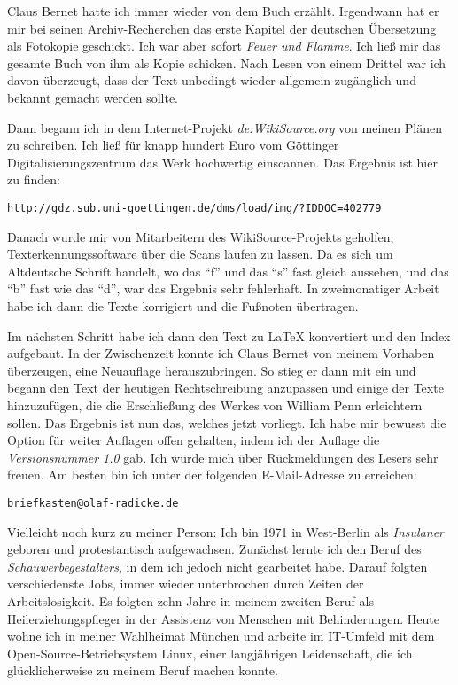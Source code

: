 \medskip

Claus Bernet hatte ich immer wieder von dem Buch erzählt. Irgendwann hat er mir
bei seinen Archiv-Recherchen das erste Kapitel der deutschen Übersetzung als
Fotokopie geschickt. Ich war aber sofort \textit{Feuer und
Flamme}. Ich ließ mir das gesamte Buch von ihm als Kopie schicken. Nach Lesen
von einem Drittel war
ich davon überzeugt, dass der Text unbedingt wieder allgemein zugänglich und
bekannt gemacht werden sollte.

\medskip

Dann begann ich in dem Internet-Projekt \textit{de.WikiSource.org} von meinen
Plänen
zu schreiben. Ich ließ für knapp hundert Euro vom Göttinger
Digitalisierungszentrum das Werk hochwertig einscannen. Das Ergebnis ist hier zu
finden:

\begin{center}
\texttt{http://gdz.sub.uni-goettingen.de/dms/load/img/?IDDOC=402779}
\end{center}

Danach wurde mir von Mitarbeitern des WikiSource-Projekts geholfen,
Texterkennungssoftware über die Scans laufen zu lassen. Da es sich um
Altdeutsche Schrift handelt, wo das "`f"' und das "`s"' fast gleich aussehen,
und das "`b"' fast wie das "`d"', war das Ergebnis sehr fehlerhaft. In
zweimonatiger Arbeit habe ich dann die Texte korrigiert und die Fußnoten
übertragen.

\medskip

Im nächsten Schritt habe ich dann den Text zu \LaTeX{} konvertiert und den Index
aufgebaut. In der Zwischenzeit konnte ich Claus Bernet von meinem Vorhaben
überzeugen, eine Neuauflage herauszubringen. So stieg er dann mit ein und begann
den Text der heutigen Rechtschreibung anzupassen und einige der Texte
hinzuzufügen, die die Erschließung des Werkes von William Penn erleichtern sollen.
Das Ergebnis ist nun das, welches jetzt vorliegt. Ich habe mir bewusst die
Option für weiter Auflagen offen gehalten, indem ich der Auflage die
\textit{Versionsnummer 1.0} gab. Ich würde mich über Rückmeldungen des Lesers
sehr freuen. Am besten bin ich unter der folgenden E-Mail-Adresse zu erreichen:

\begin{center}
\texttt{briefkasten@olaf-radicke.de}
\end{center}

Vielleicht noch kurz zu meiner Person: Ich bin 1971 in West-Berlin
als \textit{Insulaner} geboren und protestantisch aufgewachsen. Zunächst lernte
ich den Beruf des \textit{Schauwerbegestalters}, in dem ich jedoch nicht gearbeitet
habe. Darauf folgten verschiedenste Jobs, immer wieder unterbrochen durch Zeiten
der Arbeitslosigkeit. Es folgten zehn Jahre in meinem zweiten Beruf 
als Heilerziehungspfleger in der Assistenz von Menschen mit Behinderungen.
Heute wohne ich in meiner Wahlheimat München und arbeite im IT-Umfeld mit dem 
Open-Source-Betriebsystem Linux, einer langjährigen Leidenschaft, die ich 
glücklicherweise zu meinem Beruf machen konnte.

